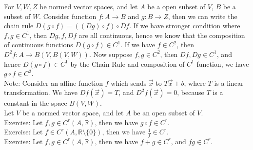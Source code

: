\documentclass[15pt]{book}
\theoremstyle{break}
\theoremstyle{break}
\newcommand{\R}{\mathbb{R}}
\newcommand{\note}{\color{red}Note: \color{black}}
\newcommand{\exercise}{\color{green}Exercise: \color{black}}
\begin{document}
For $V,W,Z$ be normed vector spaces, and let $A$ be a open subset of $V$, $B$ be a subset of $W$. Consider function $f:A \to B$ and $g:B \to Z$, then we can write the chain rule $D(g\circ f) = ((Dg)\circ f) \circ Df$. If we have stronger condition where $f,g \in C^1$, then $Dg,f,Df$ are all continuous, hence we know that the composition of continuous functions $D(g\circ f)\in C^1$. If we have $f \in C^2$, then $D^2f:A \to B(V,B(V,W))$.
Now suppose $f,g \in C^2$, then $Df,Dg\in C^1$, and hence $D(g\circ f) \in C^1$ by the Chain Rule and composition of $C^1$ function, we have $g\circ f \in C^2$. \\ 

\note Consider an affine function $f$ which sends $\vec{x}$ to $T\vec{x}+b$, where $T$ is a linear transformation. We have $Df(\vec{x}) = T$, and $D^2f(\vec{x})=0$, because $T$ is a constant in the space $B(V,W)$.  \\

Let $V$ be a normed vector space, and let $A$ be an open subset of $V$.\\
\exercise Let $f,g \in C^r(A,\R)$, then we have $g\circ f \in C^r$.\\
\exercise Let $f \in C^r(A,\R\setminus\{0\})$, then we have $\frac{1}{f}\in C^r$.\\
\exercise Let $f,g \in C^r(A,\R)$, then we have $f+g \in C^r$, and $fg \in C^r$.\\
\end{document}
